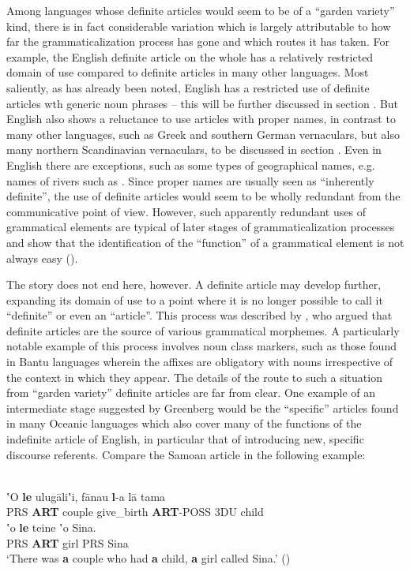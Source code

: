 Among languages whose definite articles would seem to be of a “garden variety” kind, there is in fact considerable variation which is largely attributable to how far the grammaticalization process has gone and which routes it has taken. For example, the English definite article on the whole has a relatively restricted domain of use compared to definite articles in many other languages. Most saliently, as has already been noted, English has a restricted use of definite articles wth generic noun phrases – this will be further discussed in section . But English also shows a reluctance to use articles with proper names, in contrast to many other languages, such as Greek and southern German vernaculars, but also many northern Scandinavian vernaculars, to be discussed in section . Even in English there are exceptions, such as some types of geographical names, e.g. names of rivers such as . Since proper names are usually seen as “inherently definite”, the use of definite articles would seem to be wholly redundant from the communicative point of view. However, such apparently redundant uses of grammatical elements are typical of later stages of grammaticalization processes and show that the identification of the “function” of a grammatical element is not always easy (\citet[81-86]{Dahl2004}).

The story does not end here, however. A definite article may develop further, expanding its domain of use to a point where it is no longer possible to call it “definite” or even an “article”. This process was described by \citet{Greenberg1978}, who argued that definite articles are the source of various grammatical morphemes.  A particularly notable example of this process involves noun class markers, such  as those found in Bantu languages wherein the affixes are obligatory with nouns irrespective of the context in which they appear. The details of the route to such a situation from “garden variety” definite articles are far from clear. One example of an intermediate stage suggested by Greenberg would be the “specific” articles found in many Oceanic languages which also cover many of the functions of the indefinite article of English, in particular that of introducing new, specific discourse referents. Compare the Samoan article  in the following example: 

\ea\label{}
\\
\gll	ʽO  \textbf{le} ulug\=aliʽi,  f\=anau  \textbf{l}{}-a  l\=a  tama\\
		PRS  \textbf{ART} couple  give\_birth  \textbf{ART}{}-POSS  3DU  child\\
\gll	ʽo  \textbf{le} teine  ʽo  Sina.\\
		PRS  \textbf{ART} girl  PRS  Sina\\
\glt ‘There was \textbf{a} couple who had \textbf{a} child, \textbf{a} girl called Sina.’ (\citet[259]{HovdhaugenEtAl1992})

